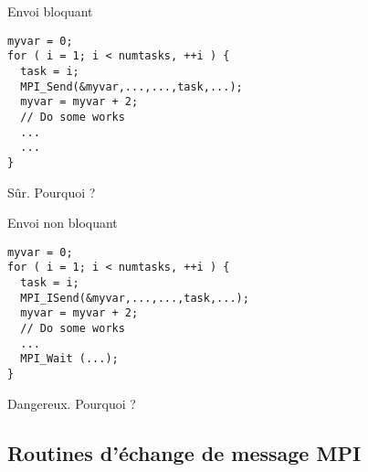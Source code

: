 \documentclass[11pt,a4paper]{article}
\begin{document}
\begin{minipage}{8cm}
\begin{center}Envoi bloquant\end{center}

\begin{lstlisting}[style=customcpp]
myvar = 0;
for ( i = 1; i < numtasks, ++i ) {
  task = i;
  MPI_Send(&myvar,...,...,task,...);
  myvar = myvar + 2;
  // Do some works
  ...
  ...
}
\end{lstlisting}

\begin{center}Sûr. Pourquoi ?\end{center}
\end{minipage}
\begin{minipage}{8cm}
\begin{center}Envoi non bloquant\end{center}

\begin{lstlisting}[style=customcpp]
myvar = 0;
for ( i = 1; i < numtasks, ++i ) {
  task = i;
  MPI_ISend(&myvar,...,...,task,...);
  myvar = myvar + 2;
  // Do some works
  ...
  MPI_Wait (...);
}
\end{lstlisting}

\begin{center}Dangereux. Pourquoi ?\end{center}
\end{minipage}

\subsection{Routines d'échange de message MPI}
\end{document}
